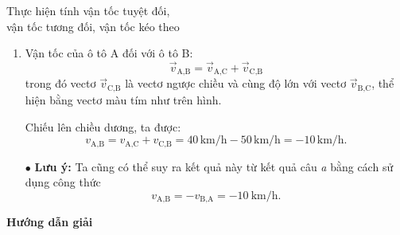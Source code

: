\begin{dang}{Thực hiện tính vận tốc tuyệt đối,\\ vận tốc tương đối, vận tốc kéo theo}
{\begin{enumerate}[label=\alph*.]
			Chiều dương được chọn là chiều chuyển động của hai ô tô.
			Chiếu lên chiều dương, ta được:
			$$v_{\textrm{B,A}}=v_{\textrm{B,C}}+v_{\textrm{C,A}}= 50\, \textrm{km/h}-40\, \textrm{km/h} = 10\, \textrm{km/h}.$$
			\item Vận tốc của ô tô A đối với ô tô B: 	$$\vec{v}_{\textrm{A,B}}=\vec{v}_{\textrm{A,C}}+\vec{v}_{\textrm{C,B}}$$
			trong đó vectơ $\vec{v}_{\textrm{C,B}}$ là vectơ ngược chiều và cùng độ lớn với vectơ $\vec{v}_{\textrm{B,C}}$, thể hiện bằng vectơ màu tím như trên hình.
			
			Chiếu lên chiều dương, ta được:
			$$v_{\textrm{A,B}}=v_{\textrm{A,C}}+v_{\textrm{C,B}}= 40\, \textrm{km/h}-50\, \textrm{km/h} = -10\, \textrm{km/h}.$$
			
			$\bullet$ \textbf{Lưu ý:} Ta cũng có thể suy ra kết quả này từ kết quả câu \textit{a} bằng cách sử dụng công thức 
			$$v_{\textrm{A,B}}=-v_{\textrm{B,A}}=-\SI{10}{\kilo\meter/\hour}.$$
		\end{enumerate}	
	}
	{	\begin{center}
			\textbf{Hướng dẫn giải}
		\end{center}
		
}
\end{dang}
